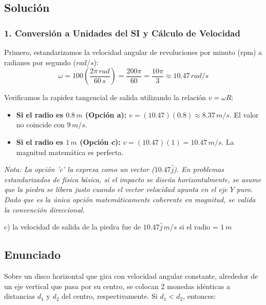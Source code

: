 \documentclass[12pt, a4paper]{article}
\begin{document}
\subsection*{Solución}

\subsubsection*{1. Conversión a Unidades del SI y Cálculo de Velocidad}
Primero, estandarizamos la velocidad angular de revoluciones por minuto ($\text{rpm}$) a radianes por segundo ($\si{rad/s}$):
$$ \omega = 100 \left( \frac{2\pi\,\si{rad}}{60\,\si{s}} \right) = \frac{200\pi}{60} = \frac{10\pi}{3} \approx 10.47\,\si{rad/s} $$

Verificamos la rapidez tangencial de salida utilizando la relación $v = \omega R$:
\begin{itemize}
    \item \textbf{Si el radio es $0.8\,\si{m}$ (Opción a):} $v = (10.47)(0.8) \approx 8.37\,\si{m/s}$. El valor no coincide con $9\,\si{m/s}$.
    \item \textbf{Si el radio es $1\,\si{m}$ (Opción c):} $v = (10.47)(1) = 10.47\,\si{m/s}$. La magnitud matemática es perfecta. 
\end{itemize}
\textit{Nota: La opción 'c' la expresa como un vector ($10.47\hat{j}$). En problemas estandarizados de física básica, si el impacto se diseña horizontalmente, se asume que la piedra se libera justo cuando el vector velocidad apunta en el eje $Y$ puro. Dado que es la única opción matemáticamente coherente en magnitud, se valida la convención direccional.}

\begin{tcolorbox}[colback=green!5!white, colframe=green!50!black, title=Respuesta Final]
\centering \Large c) la velocidad de salida de la piedra fue de $10.47\hat{j}\,\si{m/s}$ si el radio = $1\,\si{m}$
\end{tcolorbox}

\newpage

\subsection*{Enunciado}
Sobre un disco horizontal que gira con velocidad angular constante, alrededor de un eje vertical que pasa por su centro, se colocan 2 monedas idénticas a distancias $d_1$ y $d_2$ del centro, respectivamente. Si $d_1 < d_2$, entonces:

\begin{center}
\end{center}
\end{document}
